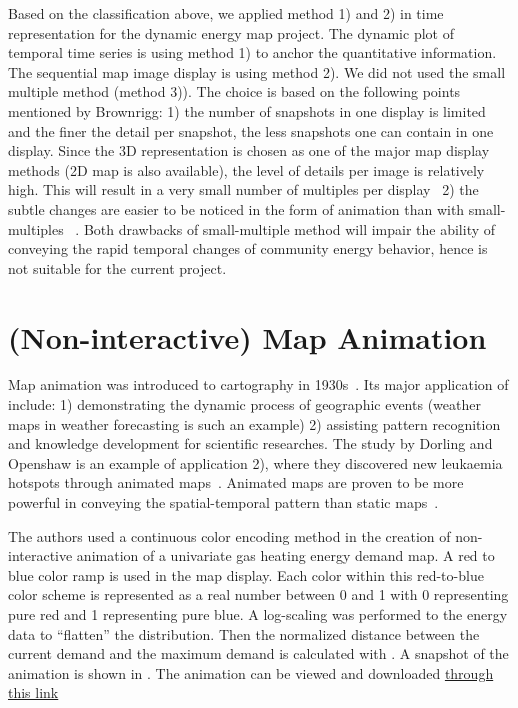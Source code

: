 Based on the classification above, we applied method 1) and 2) in time
representation for the dynamic energy map project. The dynamic plot of
temporal time series is using method 1) to anchor the quantitative
information. The sequential map image display is using method 2). We
did not used the small multiple method (method 3)). The choice is
based on the following points mentioned by Brownrigg: 1) the number of
snapshots in one display is limited and the finer the detail per
snapshot, the less snapshots one can contain in one display. Since the
3D representation is chosen as one of the major map display methods
(2D map is also available), the level of details per image is
relatively high. This will result in a very small number of multiples
per display~\cite{Brownrigg2005} 2) the subtle changes are easier to
be noticed in the form of animation than with small-multiples
~\cite{Brownrigg2005}. Both drawbacks of small-multiple method will
impair the ability of conveying the rapid temporal changes of
community energy behavior, hence is not suitable for the current
project.

\section{(Non-interactive) Map Animation} \label{anime} 

Map animation was introduced to cartography in
1930s~\cite{Harrower2008}. Its major application of include: 1)
demonstrating the dynamic process of geographic events (weather maps
in weather forecasting is such an example) 2) assisting pattern
recognition and knowledge development for scientific researches. The
study by Dorling and Openshaw is an example of application 2), where
they discovered new leukaemia hotspots through animated
maps~\cite{Dorling1992}.  Animated maps are proven to be more powerful
in conveying the spatial-temporal pattern than static
maps~\cite{McEachern1998}.

The authors used a continuous color encoding method in the creation of
non-interactive animation of a univariate gas heating energy demand
map. A red to blue color ramp is used in the map display. Each color
within this red-to-blue color scheme is represented as a real number
between 0 and 1 with 0 representing pure red and 1 representing pure
blue. A log-scaling was performed to the energy data to ``flatten''
the distribution. Then the normalized distance between the current
demand and the maximum demand is calculated with . A
snapshot of the animation is shown in . The
animation can be viewed and downloaded
\href{http://www.armechxyj.com/energy-mapping.html#colorAnime}{through
  this link}


